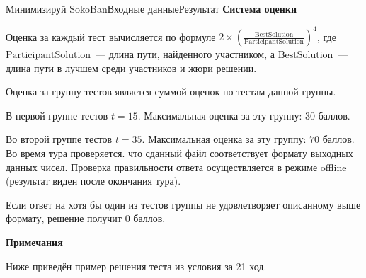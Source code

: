 \begin{problem}{Минимизируй SokoBan}{Входные данные}{Результат}{}
{\noindent\bf\problemsectionfont\textsf{Система оценки}}

Оценка за каждый тест вычисляется по формуле $2 \times\left(\frac{\text {BestSolution}}{\text {ParticipantSolution}}\right)^{4}$, где $\text{ParticipantSolution}$~--- длина пути, найденного участником, а $\text{BestSolution}$~--- длина пути в лучшем среди участников и жюри решении.

Оценка за группу тестов является суммой оценок по тестам данной группы.

В первой группе тестов $t = 15$. Максимальная оценка за эту группу: $30$ баллов. 

Во второй группе тестов $t = 35$. Максимальная оценка за эту группу: $70$ баллов. Во время тура проверяется. что сданный файл соответствует формату выходных данных чисел. Проверка правильности ответа осуществляется в режиме offline (результат виден после окончания тура).

Если ответ на хотя бы один из тестов группы не удовлетворяет описанному выше формату, решение получит 0 баллов. 

{\noindent\bf\problemsectionfont\textsf{Примечания}}

Ниже приведён пример решения теста из условия за 21 ход.

\begin{figure}
\end{figure}


\Examples
\begin{example}
%
\end{example}


\end{problem} 


